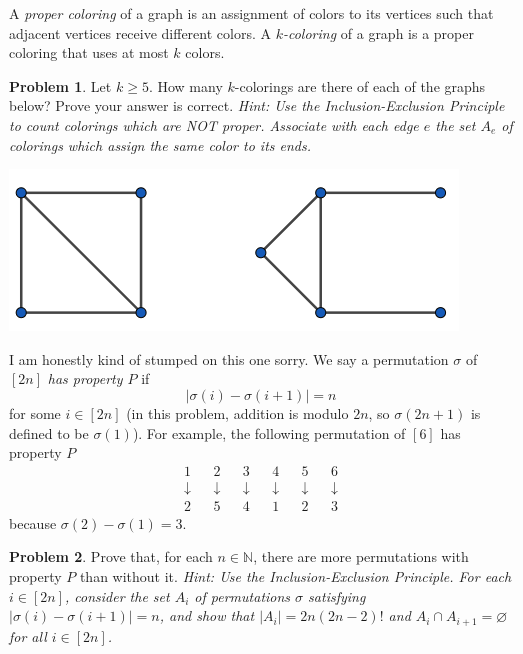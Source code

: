 \documentclass[11pt, letter]{amsart}
\theoremstyle{definition}
\newtheorem{problem}{Problem}[]
\begin{document}
\clearpage
A \textit{proper coloring} of a graph is an assignment of colors to its vertices such that adjacent vertices receive different colors.  A \textit{$k$-coloring} of a graph is a proper coloring that uses at most $k$ colors.  
\begin{problem}
  Let $k \geq 5$.  How many $k$-colorings are there of each of the graphs below?  Prove your answer is correct.
  \textit{Hint: Use the Inclusion-Exclusion Principle to count colorings which are NOT proper. Associate with each edge $e$ the set $A_e$ of colorings which assign the same color to its ends.}
\end{problem}
\begin{center}
  \includegraphics[width=.5\linewidth]{counting-colorings.png}%
\end{center}
I am honestly kind of stumped on this one sorry.
\clearpage
  We say a permutation $\sigma$ of $[2n]$ \textit{has property $P$} if
  \begin{equation*}
    |\sigma(i) - \sigma(i + 1)| = n
  \end{equation*}
  for some $i \in [2n]$ (in this problem, addition is modulo $2n$, so $\sigma(2n + 1)$ is defined to be $\sigma(1)$).  For example, the following permutation of $[6]$ has property $P$
  \begin{align*}
    1&&2&&3&&4&&5&&6\\%
    \downarrow&&\downarrow&&\downarrow&&\downarrow&&\downarrow&&\downarrow\\%
    2&&5&&4&&1&&2&&3
  \end{align*}
  because $\sigma(2) - \sigma(1) = 3$.  
\begin{problem}
  Prove that, for each $n \in \mathbb N$, there are more permutations with property $P$ than without it.
  \textit{Hint: Use the Inclusion-Exclusion Principle.  For each $i \in [2n]$, consider the set $A_i$ of permutations $\sigma$ satisfying $|\sigma(i) - \sigma(i + 1)| = n$, and show that $|A_i| = 2n(2n - 2)!$ and $A_i \cap A_{i+1} = \varnothing$ for all $i \in [2n]$.}
\end{problem}
\end{document}
